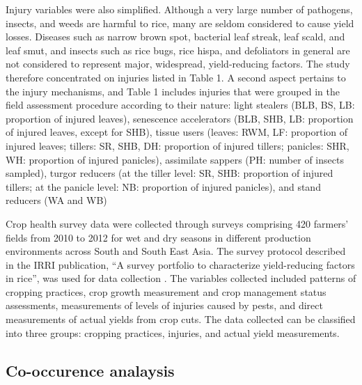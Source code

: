 \documentclass[a4paper]{article}
\begin{document}
Injury variables were also simplified. Although a very large number of pathogens, insects, and weeds are harmful to rice, many are seldom considered to cause yield losses. Diseases such as narrow brown spot, bacterial leaf streak, leaf scald, and leaf smut, and insects such as rice bugs, rice hispa, and defoliators in general are not considered to represent major, widespread, yield-reducing factors. The study therefore concentrated on injuries listed in Table 1. A second aspect pertains to the injury mechanisms, and Table 1 includes injuries that were grouped in the field assessment procedure according to their nature: light stealers (BLB, BS, LB: proportion of injured leaves), senescence accelerators (BLB, SHB, LB: proportion of injured leaves, except for SHB), tissue users (leaves: RWM, LF: proportion of injured leaves; tillers: SR, SHB, DH: proportion of injured tillers; panicles: SHR, WH: proportion of injured panicles), assimilate sappers (PH: number of insects sampled), turgor reducers (at the tiller level: SR, SHB: proportion of injured tillers; at the panicle level: NB: proportion of injured panicles), and stand reducers (WA and WB)

Crop health survey data were collected through surveys comprising 420 farmers' fields from 2010 to 2012 for wet and dry seasons in different production environments across South and South East Asia. The survey protocol described in the IRRI publication, ``A survey portfolio to characterize yield-reducing factors in rice'', was used for data collection \citep{Savarysurvey2009}. The variables collected included patterns of cropping practices, crop growth measurement and crop management status assessments, measurements of levels of injuries caused by pests, and direct measurements of actual yields from crop cuts. The data collected can be classified into three groups: cropping practices, injuries, and actual yield measurements.

\subsection*{Co-occurence analaysis}
\end{document}
